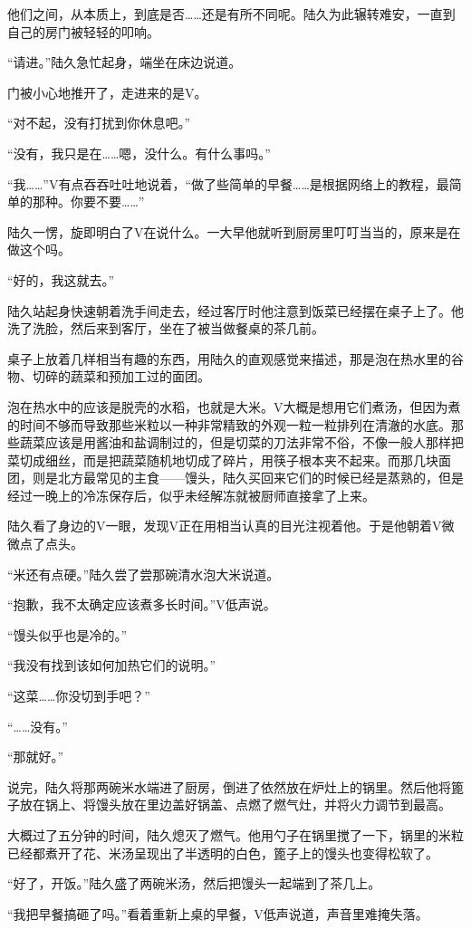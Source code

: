 他们之间，从本质上，到底是否……还是有所不同呢。陆久为此辗转难安，一直到自己的房门被轻轻的叩响。

“请进。”陆久急忙起身，端坐在床边说道。

门被小心地推开了，走进来的是V。

“对不起，没有打扰到你休息吧。”

“没有，我只是在……嗯，没什么。有什么事吗。”

“我……”V有点吞吞吐吐地说着，“做了些简单的早餐……是根据网络上的教程，最简单的那种。你要不要……”

陆久一愣，旋即明白了V在说什么。一大早他就听到厨房里叮叮当当的，原来是在做这个吗。

“好的，我这就去。”

陆久站起身快速朝着洗手间走去，经过客厅时他注意到饭菜已经摆在桌子上了。他洗了洗脸，然后来到客厅，坐在了被当做餐桌的茶几前。

桌子上放着几样相当有趣的东西，用陆久的直观感觉来描述，那是泡在热水里的谷物、切碎的蔬菜和预加工过的面团。

泡在热水中的应该是脱壳的水稻，也就是大米。V大概是想用它们煮汤，但因为煮的时间不够而导致那些米粒以一种非常精致的外观一粒一粒排列在清澈的水底。那些蔬菜应该是用酱油和盐调制过的，但是切菜的刀法非常不俗，不像一般人那样把菜切成细丝，而是把蔬菜随机地切成了碎片，用筷子根本夹不起来。而那几块面团，则是北方最常见的主食——馒头，陆久买回来它们的时候已经是蒸熟的，但是经过一晚上的冷冻保存后，似乎未经解冻就被厨师直接拿了上来。

陆久看了身边的V一眼，发现V正在用相当认真的目光注视着他。于是他朝着V微微点了点头。

“米还有点硬。”陆久尝了尝那碗清水泡大米说道。

“抱歉，我不太确定应该煮多长时间。”V低声说。

“馒头似乎也是冷的。”

“我没有找到该如何加热它们的说明。”

“这菜……你没切到手吧？”

“……没有。”

“那就好。”

说完，陆久将那两碗米水端进了厨房，倒进了依然放在炉灶上的锅里。然后他将篦子放在锅上、将馒头放在里边盖好锅盖、点燃了燃气灶，并将火力调节到最高。

大概过了五分钟的时间，陆久熄灭了燃气。他用勺子在锅里搅了一下，锅里的米粒已经都煮开了花、米汤呈现出了半透明的白色，篦子上的馒头也变得松软了。

“好了，开饭。”陆久盛了两碗米汤，然后把馒头一起端到了茶几上。

“我把早餐搞砸了吗。”看着重新上桌的早餐，V低声说道，声音里难掩失落。

